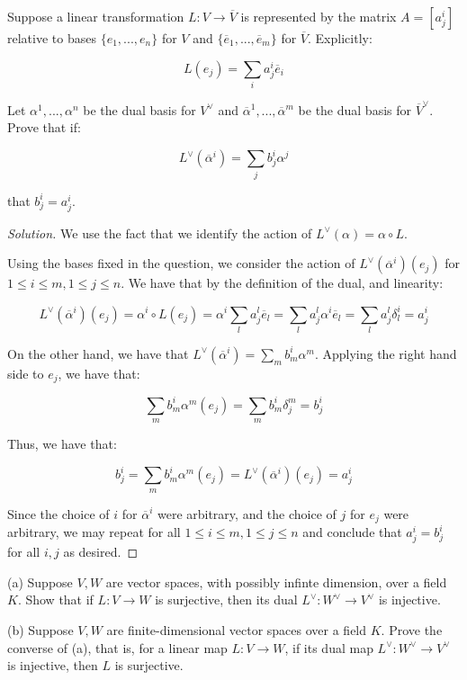 \documentclass[10pt]{article}
\newenvironment{problem}[2][]{\begin{trivlist}
\item[\hskip \labelsep {\bfseries #1}\hskip \labelsep {\bfseries #2.}]}{\end{trivlist}}
\begin{document}
\begin{problem}{Question 5}

Suppose a linear transformation $L: V \to \overline{V}$ is represented by the matrix $A = [a^i_j]$ relative to bases $\{ e_1,...,e_n \}$ for $V$ and $\{ \overline{e}_1,..., \overline{e}_m \}$ for $\overline{V}$. Explicitly:

$$ L(e_j) = \sum_i a^i_j \overline{e}_i$$

Let $\alpha^1,...,\alpha^n$ be the dual basis for $V^\vee$ and $\overline{\alpha}^1,...,\overline{\alpha}^m$ be the dual basis for $\overline{V}^\vee$. Prove that if:

$$ L^\vee(\overline{\alpha}^i) = \sum_j b^i_j \alpha^j$$

that $b^i_j = a^i_j$.

\end{problem}

\begin{proof}[Solution]

We use the fact that we identify the action of $L^\vee(\alpha) = \alpha \circ L$.

Using the bases fixed in the question, we consider the action of $L^\vee(\overline{\alpha}^i)(e_j)$ for $1 \leq i \leq m, 1 \leq j \leq n$. We have that by the definition of the dual, and linearity:

$$L^\vee(\overline{\alpha}^i)(e_j) = \alpha^i \circ L(e_j) = \alpha^i \sum_l a^l_j \overline{e}_l =\sum_l a^l_j \alpha^i \overline{e}_l = \sum_l a^l_j \delta^i_l = a^i_j$$

On the other hand, we have that $ L^\vee(\overline{\alpha}^i) = \sum_m b^i_m \alpha^m$. Applying the right hand side to $e_j$, we have that:

$$ \sum_m b^i_m \alpha^m(e_j) = \sum_m b^i_m \delta ^m_j = b^i_j $$

Thus, we have that:

$$ b^i_j =  \sum_m b^i_m \alpha^m(e_j) =  L^\vee(\overline{\alpha}^i)(e_j)  = a^i_j$$

Since the choice of $i$ for $\overline{\alpha}^i$ were arbitrary, and the choice of $j$ for $e_j$ were arbitrary, we may repeat for all  $1 \leq i \leq m, 1 \leq j \leq n$ and conclude that $a^i_j = b^i_j$ for all $i,j$ as desired. 

\end{proof}



\begin{problem}{Question 6}

(a) Suppose $V, W$ are vector spaces, with possibly infinte dimension, over a field $K$. Show that if $L: V \to W$ is surjective, then its dual $L^\vee: W^\vee \to V^\vee$ is injective.

(b) Suppose $V,W$ are finite-dimensional vector spaces over a field $K$. Prove the converse of (a), that is, for a linear map $L: V \to W$,  if its dual map $L^\vee: W^\vee \to V^\vee$ is injective, then $L$ is surjective.

\end{problem}
\end{document}
